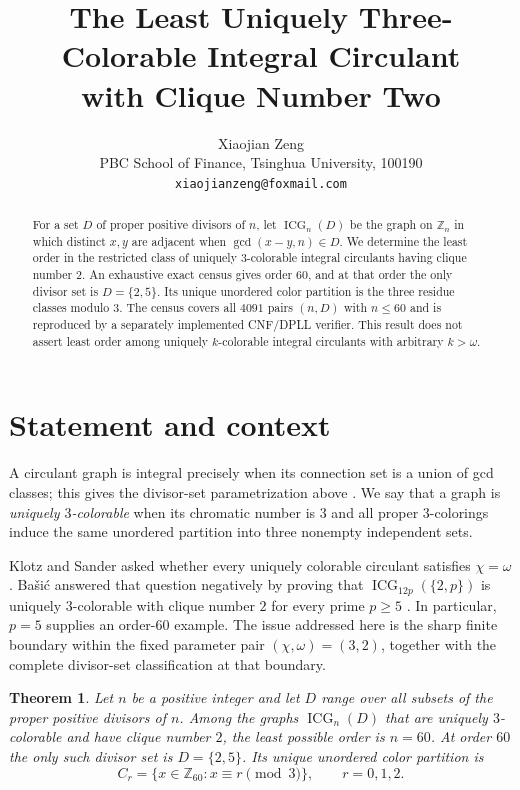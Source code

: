 \documentclass[11pt]{article}
\title{The Least Uniquely Three-Colorable Integral Circulant\\
with Clique Number Two}
\author{Xiaojian Zeng\\
\small PBC School of Finance, Tsinghua University, 100190\\
\small \texttt{xiaojianzeng@foxmail.com}}
\date{}
\newtheorem{theorem}{Theorem}
\newcommand{\Z}{\mathbb Z}
\newcommand{\ICG}{\operatorname{ICG}}
\begin{document}
\maketitle

\begin{abstract}
For a set $D$ of proper positive divisors of $n$, let $\ICG_n(D)$ be the
graph on $\Z_n$ in which distinct $x,y$ are adjacent when
$\gcd(x-y,n)\in D$.  We determine the least order in the restricted class
of uniquely $3$-colorable integral circulants having clique number $2$.
An exhaustive exact census gives order $60$, and at that order the only
divisor set is $D=\{2,5\}$.  Its unique unordered color partition is the
three residue classes modulo $3$.  The census covers all $4091$ pairs
$(n,D)$ with $n\leq 60$ and is reproduced by a separately implemented
CNF/DPLL verifier.  This result does not assert least order among uniquely
$k$-colorable integral circulants with arbitrary $k>\omega$.
\end{abstract}

\section{Statement and context}

A circulant graph is integral precisely when its connection set is a union
of gcd classes; this gives the divisor-set parametrization above
\cite{So2006}.  We say that a graph is \emph{uniquely $3$-colorable} when
its chromatic number is $3$ and all proper $3$-colorings induce the same
unordered partition into three nonempty independent sets.

Klotz and Sander asked whether every uniquely colorable circulant satisfies
$\chi=\omega$ \cite[Problem~3.6]{KlotzSander2017}.  Ba\v{s}i\'c answered that
question negatively by proving that
$\ICG_{12p}(\{2,p\})$ is uniquely $3$-colorable with clique number $2$ for
every prime $p\geq5$ \cite[Theorem~3.1]{Basic2026}.  In particular, $p=5$
supplies an order-$60$ example.  The issue addressed here is the sharp
finite boundary within the fixed parameter pair
$(\chi,\omega)=(3,2)$, together with the complete divisor-set
classification at that boundary.

\begin{theorem}\label{thm:main}
Let $n$ be a positive integer and let $D$ range over all subsets of the
proper positive divisors of $n$.  Among the graphs $\ICG_n(D)$ that are
uniquely $3$-colorable and have clique number $2$, the least possible order
is $n=60$.  At order $60$ the only such divisor set is
$D=\{2,5\}$.  Its unique unordered color partition is
\[
  C_r=\{x\in\Z_{60}:x\equiv r\pmod 3\},\qquad r=0,1,2.
\]
\end{theorem}
\end{document}
